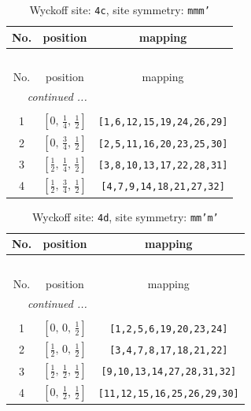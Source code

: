 \documentclass[fleqn,8pt]{jsarticle}
\begin{document}
\renewcommand{\arraystretch}{1.2}
\begin{longtable}{ccc}
\caption{Wyckoff site: {\tt 4c}, site symmetry: {\tt mmm'}}
 \\
 \hline \hline
No. & position & mapping \\ \hline \endfirsthead

\multicolumn{2}{l}{\tablename\ \thetable{}} \\
 \hline \hline
No. & position & mapping \\ \hline \endhead

 \hline \hline
\multicolumn{2}{r}{\footnotesize\it continued ...} \\ \endfoot

 \hline \hline
\multicolumn{2}{r}{} \\ \endlastfoot

1 & $\left[ 0,\, \frac{1}{4},\, \frac{1}{2} \right]$ & {\tt [1,6,12,15,19,24,26,29]} \\ \hline
2 & $\left[ 0,\, \frac{3}{4},\, \frac{1}{2} \right]$ & {\tt [2,5,11,16,20,23,25,30]} \\ \hline
3 & $\left[ \frac{1}{2},\, \frac{1}{4},\, \frac{1}{2} \right]$ & {\tt [3,8,10,13,17,22,28,31]} \\ \hline
4 & $\left[ \frac{1}{2},\, \frac{3}{4},\, \frac{1}{2} \right]$ & {\tt [4,7,9,14,18,21,27,32]} \\
\end{longtable}
\renewcommand{\arraystretch}{1.2}
\begin{longtable}{ccc}
\caption{Wyckoff site: {\tt 4d}, site symmetry: {\tt mm'm'}}
 \\
 \hline \hline
No. & position & mapping \\ \hline \endfirsthead

\multicolumn{2}{l}{\tablename\ \thetable{}} \\
 \hline \hline
No. & position & mapping \\ \hline \endhead

 \hline \hline
\multicolumn{2}{r}{\footnotesize\it continued ...} \\ \endfoot

 \hline \hline
\multicolumn{2}{r}{} \\ \endlastfoot

1 & $\left[ 0,\, 0,\, \frac{1}{2} \right]$ & {\tt [1,2,5,6,19,20,23,24]} \\ \hline
2 & $\left[ \frac{1}{2},\, 0,\, \frac{1}{2} \right]$ & {\tt [3,4,7,8,17,18,21,22]} \\ \hline
3 & $\left[ \frac{1}{2},\, \frac{1}{2},\, \frac{1}{2} \right]$ & {\tt [9,10,13,14,27,28,31,32]} \\ \hline
4 & $\left[ 0,\, \frac{1}{2},\, \frac{1}{2} \right]$ & {\tt [11,12,15,16,25,26,29,30]} \\
\end{longtable}
\end{document}
